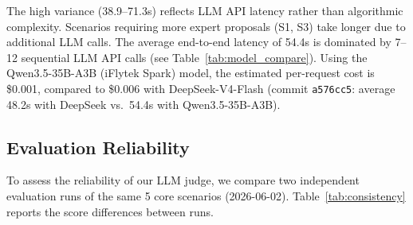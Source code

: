 \begin{table}[!t]
\centering
\caption{Per-scenario latency (median of 2 runs, 2026-06-02).}
\label{tab:scenario_latency}
\end{table}

The high variance (38.9--71.3s) reflects LLM API latency rather than algorithmic complexity. Scenarios requiring more expert proposals (S1, S3) take longer due to additional LLM calls. The average end-to-end latency of 54.4s is dominated by 7--12 sequential LLM API calls (see Table~\ref{tab:model_compare}). Using the Qwen3.5-35B-A3B (iFlytek Spark) model, the estimated per-request cost is \$0.001, compared to \$0.006 with DeepSeek-V4-Flash (commit \texttt{a576cc5}: average 48.2s with DeepSeek vs.\ 54.4s with Qwen3.5-35B-A3B).

\subsection{Evaluation Reliability}

To assess the reliability of our LLM judge, we compare two independent evaluation runs of the same 5 core scenarios (2026-06-02). Table~\ref{tab:consistency} reports the score differences between runs.

\begin{table}[!t]
\centering
\caption{LLM judge reliability: score difference between two independent evaluation runs.}
\label{tab:consistency}
\end{table}

